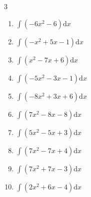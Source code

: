 \begin{multicols}{3}
\begin{enumerate}
\columnbreak %

  \item $\displaystyle \int \left( -6x^{2}-6 \right) \mathrm{d}x$


  \item $\displaystyle \int \left( -x^{2}+5x-1 \right) \mathrm{d}x$


  \item $\displaystyle \int \left( x^{2}-7x+6 \right) \mathrm{d}x$


  \item $\displaystyle \int \left( -5x^{2}-3x-1 \right) \mathrm{d}x$


  \item $\displaystyle \int \left( -8x^{2}+3x+6 \right) \mathrm{d}x$


  \item $\displaystyle \int \left( 7x^{2}-8x-8 \right) \mathrm{d}x$


  \item $\displaystyle \int \left( 5x^{2}-5x+3 \right) \mathrm{d}x$


  \item $\displaystyle \int \left( 7x^{2}-7x+4 \right) \mathrm{d}x$


  \item $\displaystyle \int \left( 7x^{2}+7x-3 \right) \mathrm{d}x$


  \item $\displaystyle \int \left( 2x^{2}+6x-4 \right) \mathrm{d}x$



\end{enumerate}
\end{multicols}
